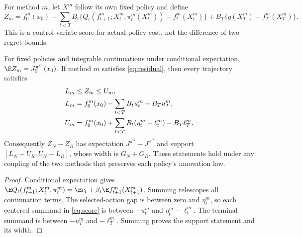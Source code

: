 \documentclass[ecta,nameyear,draft]{econsocart}
\begin{document}
For method $m$, let $X^m$ follow its own fixed policy and define
\begin{equation}\label{eq:score}
 Z_m=f_0^m(x_0)+\sum_{t<T}B_t
  \{Q_t(f_{t+1}^m;X_t^m,\pi_t^m(X_t^m))-f_t^m(X_t^m)\}
       +B_T\{g(X_T^m)-f_T^m(X_T^m)\}.
\end{equation}
This is a control-variate score for actual policy cost, not the difference of two regret bounds.

\begin{theorem}\label{thm:paired}
For fixed policies and integrable continuations under conditional expectation,
$\E Z_m=J^{\pi^m}_0(x_0)$. If method $m$ satisfies \eqref{eq:residual}, then every trajectory satisfies
\begin{align}\label{eq:support}
 L_m&\leq Z_m\leq U_m,\\
 L_m&=f_0^m(x_0)-\sum_{t<T}B_tu_t^m-B_Tu_T^m,\notag\\
 U_m&=f_0^m(x_0)+\sum_{t<T}B_t(\eta_t^m-\ell_t^m)-B_T\ell_T^m.\notag
\end{align}
Consequently $Z_N-Z_R$ has expectation $J^{\pi^N}-J^{\pi^R}$ and support
$[L_N-U_R,U_N-L_R]$, whose width is $G_N+G_R$. These statements hold under any coupling of the two methods that preserves each policy's innovation law.
\end{theorem}

\begin{proof}
Conditional expectation gives $\E Q_t(f_{t+1}^m;X_t^m,\pi_t^m)=\E c_t+\beta_t\E f_{t+1}^m(X_{t+1}^m)$. Summing telescopes all continuation terms. The selected-action gap is between zero and $\eta_t^m$, so each centered summand in \eqref{eq:score} is between $-u_t^m$ and $\eta_t^m-\ell_t^m$. The terminal summand is between $-u_T^m$ and $-\ell_T^m$. Summing proves the support statement and its width.
\end{proof}
\end{document}
